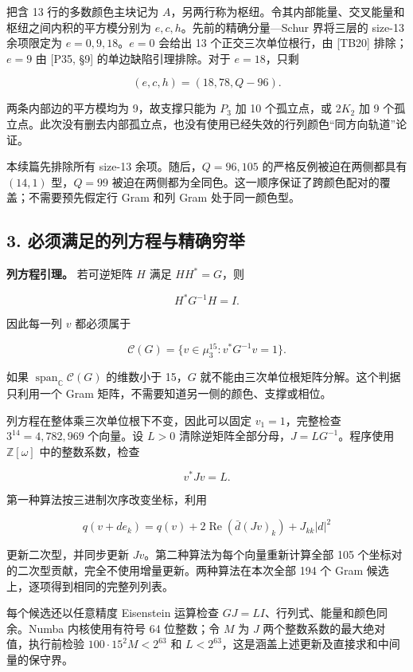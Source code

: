 \documentclass[
  11pt,
  a4paper,
]{article}
\begin{document}
把含 13 行的多数颜色主块记为
\(A\)，另两行称为枢纽。令其内部能量、交叉能量和枢纽之间内积的平方模分别为
\(e,c,h\)。先前的精确分量---Schur 界将三层的 size-13 余项限定为
\(e=0,9,18\)。\(e=0\) 会给出 13 个正交三次单位根行，由 {[}TB20{]}
排除；\(e=9\) 由 {[}P35, §9{]} 的单边缺陷引理排除。对于 \(e=18\)，只剩

\[ (e,c,h)=(18,78,Q-96). \]

两条内部边的平方模均为 9，故支撑只能为 \(P_3\) 加 10 个孤立点，或
\(2K_2\) 加 9
个孤立点。此次没有删去内部孤立点，也没有使用已经失效的行列颜色``同方向轨道''论证。

本续篇先排除所有 size-13 余项。随后，\(Q=96,105\)
的严格反例被迫在两侧都具有 \((14,1)\) 型，\(Q=99\)
被迫在两侧都为全同色。这一顺序保证了跨颜色配对的覆盖；不需要预先假定行
Gram 和列 Gram 处于同一颜色型。

\subsection{3.
必须满足的列方程与精确穷举}\label{ux5fc5ux987bux6ee1ux8db3ux7684ux5217ux65b9ux7a0bux4e0eux7cbeux786eux7a77ux4e3e}

\textbf{列方程引理。} 若可逆矩阵 \(H\) 满足 \(HH^*=G\)，则

\[H^*G^{-1}H=I.\]

因此每一列 \(v\) 都必须属于

\[\mathcal C(G)=\{v\in\mu_3^{15}:v^*G^{-1}v=1\}.\]

如果 \(\operatorname{span}_{\mathbb C}\mathcal C(G)\) 的维数小于
15，\(G\) 就不能由三次单位根矩阵分解。这个判据只利用一个 Gram
矩阵，不需要知道另一侧的颜色、支撑或相位。

列方程在整体乘三次单位根下不变，因此可以固定 \(v_1=1\)，完整检查
\(3^{14}=4,782,969\) 个向量。设 \(L>0\)
清除逆矩阵全部分母，\(J=LG^{-1}\)。程序使用 \(\mathbb Z[\omega]\)
中的整数系数，检查

\[v^*Jv=L.\]

第一种算法按三进制次序改变坐标，利用

\[q(v+d e_k)=q(v)+2\operatorname{Re}\!\left(\bar d(Jv)_k\right)+J_{kk}|d|^2\]

更新二次型，并同步更新 \(Jv\)。第二种算法为每个向量重新计算全部 105
个坐标对的二次型贡献，完全不使用增量更新。两种算法在本次全部 194 个 Gram
候选上，逐项得到相同的完整列列表。

每个候选还以任意精度 Eisenstein 运算检查
\(GJ=LI\)、行列式、能量和颜色同余。Numba 内核使用有符号 64 位整数；令
\(M\) 为 \(J\) 两个整数系数的最大绝对值，执行前检验
\(100\cdot15^2M<2^{63}\) 和
\(L<2^{63}\)，这是涵盖上述更新及直接求和中间量的保守界。
\end{document}
